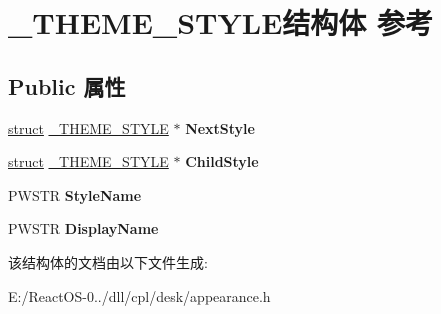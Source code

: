 \hypertarget{struct___t_h_e_m_e___s_t_y_l_e}{}\section{\+\_\+\+T\+H\+E\+M\+E\+\_\+\+S\+T\+Y\+L\+E结构体 参考}
\label{struct___t_h_e_m_e___s_t_y_l_e}
\subsection*{Public 属性}
\begin{DoxyCompactItemize}
\item 
\mbox{\label{struct___t_h_e_m_e___s_t_y_l_e_a52bfafe66132fba62396e8039329d2c0}} 
\hyperlink{interfacestruct}{struct} \hyperlink{struct___t_h_e_m_e___s_t_y_l_e}{\+\_\+\+T\+H\+E\+M\+E\+\_\+\+S\+T\+Y\+LE} $\ast$ {\bfseries Next\+Style}
\item 
\mbox{\label{struct___t_h_e_m_e___s_t_y_l_e_a0366c918b511219dc232bbfd11949816}} 
\hyperlink{interfacestruct}{struct} \hyperlink{struct___t_h_e_m_e___s_t_y_l_e}{\+\_\+\+T\+H\+E\+M\+E\+\_\+\+S\+T\+Y\+LE} $\ast$ {\bfseries Child\+Style}
\item 
\mbox{\label{struct___t_h_e_m_e___s_t_y_l_e_a2a74332345ad0872e520cff2272b8a08}} 
P\+W\+S\+TR {\bfseries Style\+Name}
\item 
\mbox{\label{struct___t_h_e_m_e___s_t_y_l_e_a82294d9ecfc4302acad63eaf7d64949f}} 
P\+W\+S\+TR {\bfseries Display\+Name}
\end{DoxyCompactItemize}


该结构体的文档由以下文件生成\+:\begin{DoxyCompactItemize}
\item 
E\+:/\+React\+O\+S-\/0../dll/cpl/desk/appearance.\+h\end{DoxyCompactItemize}
